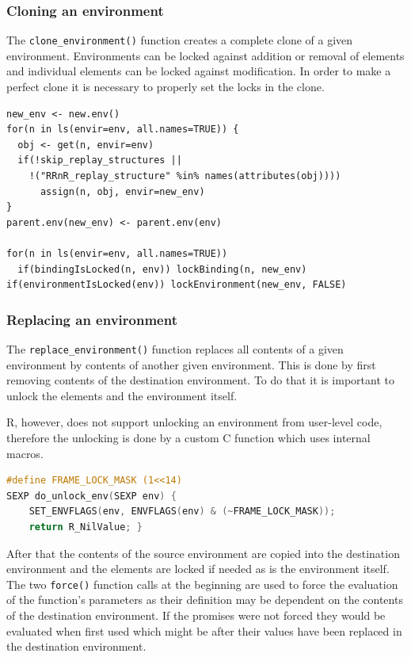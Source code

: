 \documentclass[thesis=M,english,hidelinks]{FITthesis}[2012/10/20]
\begin{document}
			\subsubsection{Cloning an environment}
			The \lstinline|clone_environment()| function creates a complete clone of a given environment. Environments can be locked against addition or removal of elements and individual elements can be locked against modification. In order to make a perfect clone it is necessary to properly set the locks in the clone.\par
		
\begin{lstlisting}[style=filestyle, caption={The \lstinline|clone_environment()| function}]
new_env <- new.env()
for(n in ls(envir=env, all.names=TRUE)) {
  obj <- get(n, envir=env)
  if(!skip_replay_structures ||
    !("RRnR_replay_structure" %in% names(attributes(obj))))
      assign(n, obj, envir=new_env)
}
parent.env(new_env) <- parent.env(env)

for(n in ls(envir=env, all.names=TRUE))
  if(bindingIsLocked(n, env)) lockBinding(n, new_env)
if(environmentIsLocked(env)) lockEnvironment(new_env, FALSE)
\end{lstlisting}
		
			\vspace{-15pt}
			\subsubsection{Replacing an environment}
			The \lstinline|replace_environment()| function replaces all contents of a given environment by contents of another given environment. This is done by first removing contents of the destination environment. To do that it is important to unlock the elements and the environment itself.\par
			
			R, however, does not support unlocking an environment from user-level code, therefore the unlocking is done by a custom C function which uses internal macros.\par
			
\begin{lstlisting}[style=filestyle, language=C, caption={Custom environment unlocking function}]
#define FRAME_LOCK_MASK (1<<14)
SEXP do_unlock_env(SEXP env) {
	SET_ENVFLAGS(env, ENVFLAGS(env) & (~FRAME_LOCK_MASK));
	return R_NilValue; }
\end{lstlisting}
			
			After that the contents of the source environment are copied into the destination environment and the elements are locked if needed as is the environment itself. The two \lstinline|force()| function calls at the beginning are used to force the evaluation of the function's parameters as their definition may be dependent on the contents of the destination environment. If the promises were not forced they would be evaluated when first used which might be after their values have been replaced in the destination environment.\par
		
\end{document}
